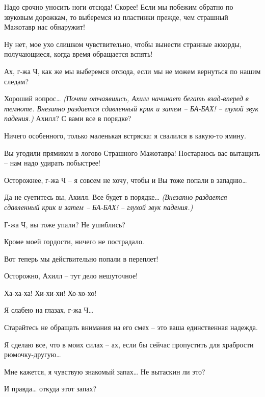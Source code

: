 \documentclass[../main.tex]{subfiles}
\begin{document}
\begin{Dialogue}
\begin{sublevel}
\begin{sublevel}
\begin{sublevel}
 Надо срочно уносить ноги отсюда! Скорее! Если мы побежим обратно по звуковым дорожкам, то выберемся из пластинки прежде, чем страшный Мажотавр нас обнаружит!

 Ну нет, мое ухо слишком чувствительно, чтобы вынести странные аккорды, получающиеся, когда время обращается вспять!

 Ах, г-жа Ч, как же мы выберемся отсюда, если мы не можем вернуться по нашим следам?

 Хороший вопрос\ldots{} \emph{(Почти отчаявшись, Ахилл начинает бегать взад-вперед в темноте. Внезапно раздается сдавленный крик и затем \--- БА-БАХ! \--- глухой звук падения.)} Ахилл? С вами все в порядке?

 Ничего особенного, только маленькая встряска: я свалился в какую-то ямину.

 Вы угодили прямиком в логово Страшного Мажотавра! Постараюсь вас вытащить \--- нам надо удирать побыстрее!

 Осторожнее, г-жа Ч \--- я совсем не хочу, чтобы и Вы тоже попали в западню\ldots{}

 Да не суетитесь вы, Ахилл. Все будет в порядке\ldots{} \emph{(Внезапно раздается сдавленный крик и затем \--- БА-БАХ! \--- глухой звук падения.)}

 Г-жа Ч, вы тоже упали? Не ушиблись?

 Кроме моей гордости, ничего не пострадало.

 Вот теперь мы действительно попали в переплет!


 Осторожно, Ахилл \--- тут дело нешуточное!

 Ха-ха-ха! Хи-хи-хи! Хо-хо-хо!

 Я слабею на глазах, г-жа Ч\ldots{}

 Старайтесь не обращать внимания на его смех \--- это ваша единственная надежда.

 Я сделаю все, что в моих силах \--- ах, если бы сейчас пропустить для храбрости рюмочку-другую\ldots{}

 Мне кажется, я чувствую знакомый запах\ldots{} Не вытаскин ли это?

 И правда\ldots{} откуда этот запах?


\end{sublevel}
\end{sublevel}
\end{sublevel}
\end{Dialogue}
\end{document}
